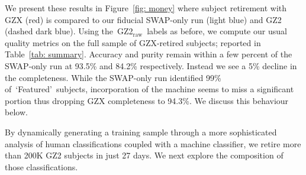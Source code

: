 \documentclass[twocolumn,  trackchanges, ]{aastex6}%
\newcommand{\feat}{`Featured'}
\newcommand{\raw}{GZ2$_{\text{raw}}$}
\begin{document}
We present these results in Figure~\ref{fig: money} where subject retirement with GZX (red) is compared to our fiducial SWAP-only run (light blue) and GZ2 (dashed dark blue). Using the~\raw~labels as before, we compute our usual quality metrics on the full sample of GZX-retired subjects; reported in Table~\ref{tab: summary}. Accuracy and purity remain within a few percent of the SWAP-only run at 93.5\% and 84.2\% respectively. Instead we see a 5\% decline in the completeness. While the SWAP-only run identified 99\% of~\feat~subjects, incorporation of the machine seems to miss a significant portion thus dropping GZX completeness to 94.3\%. We discuss this behaviour below.

By dynamically generating a training sample through a more sophisticated analysis of human classifications coupled with a machine classifier, we retire more than 200K GZ2 subjects in just 27 days.  We next explore the composition of those classifications.
\end{document}
